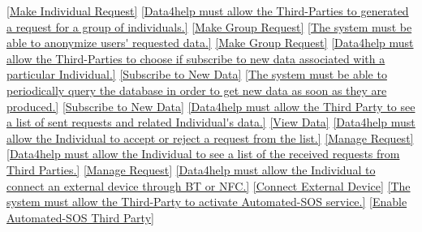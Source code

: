 \documentclass[a4paper]{article}
\begin{document}
\begin{traceabilitymatrix}
                {\ref{Make Individual Request}}
                {}
            \con{\ref{The Third-Party should be able to make group requests.}}
                {\ref{Data4help must allow the Third-Parties to generated a request for a group of individuals.}}
                {\ref{Make Group Request}}
                {}
            \con{\ref{The Third-Party should be able to make group requests.}}
                {\ref{The system must be able to anonymize users' requested data.}}
                {\ref{Make Group Request}}
                {}
            \con{\ref{The Third-Party should be able to subscribe to new data, once an Individual request is made.}}
                {\ref{Data4help must allow the Third-Parties to choose if subscribe to new data associated with a particular Individual.}}
                {\ref{Subscribe to New Data}}
                {}
            \con{\ref{The Third-Party should be able to subscribe to new data, once an Individual request is made.}}
                {\ref{The system must be able to periodically query the database in order to get new data as soon as they are produced.}}
                {\ref{Subscribe to New Data}}
                {}
            \con{\ref{The Third Party should be able to view Individual's data to whom has sent a request.}}
                {\ref{Data4help must allow the Third Party to see a list of sent requests and related Individual's data.}}
                {\ref{View Data}}
                {}
            \con{\ref{The Individual should be able to accept or reject a request coming from a Third-Party.}}
                {\ref{Data4help must allow the Individual to accept or reject a request from the list.}}
                {\ref{Manage Request}}
                {}
            \con{\ref{The Individual should be able to accept or reject a request coming from a Third-Party.}}
                {\ref{Data4help must allow the Individual to see a list of the received requests from Third Parties.}}
                {\ref{Manage Request}}
                {}
            \con{\ref{The Individual shall be able connect an external device to the system.}}
                {\ref{Data4help must allow the Individual to connect an external device through BT or NFC.}}
                {\ref{Connect External Device}}
                {}
            \con{\ref{The Third-Party shall be able to activate Automated-SOS service.}}
                {\ref{The system must allow the Third-Party to activate Automated-SOS service.}}
                {\ref{Enable Automated-SOS Third Party}}
                {}
                \con{\ref{The Third-Party shall be able to activate Automated-SOS service.}}

\end{traceabilitymatrix}
\end{document}
